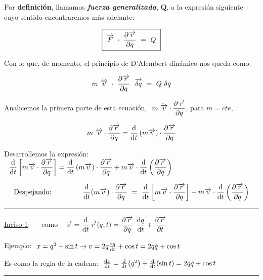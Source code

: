 Por \textbf{definición}, llamamos \textbf{\emph{fuerza generalizada}}, $\boldsymbol {Q}$, a la expresión siguiente cuyo sentido encontraremos más adelante:

\begin{equation}
\label{T2FG}	
\boxed{ \ \overrightarrow F \ \cdot \ \pdv{\overrightarrow r}{q}\ =  \ Q \ }
\end{equation}

Con lo que, de momento, el principio de D'Alembert dinámico nos queda como:

\begin{equation}
\label{T2PDD2}
m \dot{ \ \overrightarrow v} \ \cdot \ 	\pdv{\overrightarrow r}{q} \ \ \overrightarrow{\var q} \ = \ Q\ \var q
\end{equation}

Analicemos la primera parte de esta ecuación, $\displaystyle \ m \dot{ \ \overrightarrow v}  \cdot 	\pdv{\overrightarrow r}{q}$, para $m=cte$,

$$\displaystyle m \dot{ \ \overrightarrow v} \cdot \pdv{\overrightarrow r}{q} = \dv{t} \, (m\overrightarrow v)\cdot \pdv{\overrightarrow r}{q}$$

Desarrollemos la expresión: $\displaystyle \ \ \dv{t} \left[ m \overrightarrow v \cdot \pdv{\overrightarrow r}{q} \right] = 
 \dv{t} \, (m\overrightarrow v)\cdot \pdv{\overrightarrow r}{q} +
 m \overrightarrow v \cdot \dv{t} \left( \pdv{\overrightarrow r}{q} \right)   $
 
 
 \begin{equation}
 \label{T2PDD3}
 \text{Despejando: } \qquad \qquad 
 \dv{t} (m\overrightarrow v) \cdot \pdv{\overrightarrow r}{q} \ = \ 	
 \dv{t} \left[ m \overrightarrow v \cdot \pdv{\overrightarrow r}{q} \right] -
 m \overrightarrow v \cdot \dv{t} \left( \pdv{\overrightarrow r}{q} \right)
 \end{equation}

 
\rule{150pt}{0.1pt}

\underline{Inciso 1}:  $\quad$ como $\displaystyle \ \ \overrightarrow v= \dv{t} \overrightarrow r(q,t)= \pdv{\overrightarrow r}{q} \ \dv{q}{t} + \pdv{\overrightarrow r}{t}$

\textcolor{gris}{Ejemplo: $\ x=q^2+\sin t \to v=2q\dv{q}{t}+\cos t=2q\dot q+\cos t$}

\textcolor{gris}{Es como la regla de la cadena: $\ \dv{x}{t} = \dv{t} (q^2) + \dv{t} (\sin t) = 2q\dot q + \cos t$}

\begin{flushright}
\rule{200pt}{0.1pt}	
\end{flushright}

